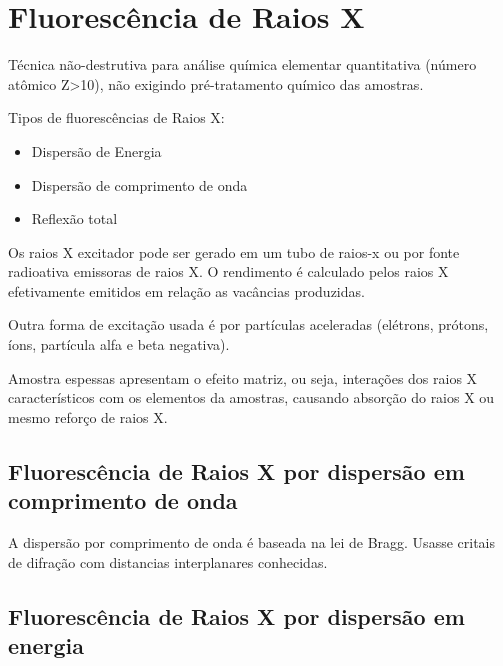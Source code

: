 \section{Fluorescência de Raios X}

Técnica não-destrutiva para análise química elementar 
quantitativa (número atômico Z>10), não exigindo pré-tratamento químico das amostras. 

Tipos de fluorescências de Raios X:
\begin{itemize}
  \item Dispersão de Energia
  \item Dispersão de comprimento de onda
  \item Reflexão total
\end{itemize}

Os raios X excitador pode ser gerado em um tubo de raios-x ou por fonte radioativa 
emissoras de raios X.
O rendimento é calculado pelos raios X efetivamente emitidos em relação as 
vacâncias produzidas.


Outra forma de excitação usada é por partículas aceleradas 
(elétrons, prótons, íons, partícula alfa e beta negativa).

Amostra espessas apresentam o efeito matriz, ou seja, interações dos 
raios X característicos com os elementos da amostras, causando 
absorção do raios X ou mesmo reforço de raios X.

\subsection{Fluorescência de Raios X por dispersão em comprimento de onda}

A dispersão por comprimento de onda é baseada na lei de Bragg.
Usasse critais de difração com distancias interplanares conhecidas.
  

\subsection{Fluorescência de Raios X por dispersão em energia}

